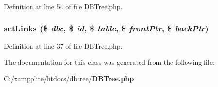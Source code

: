 Definition at line 54 of file DBTree.php.
\subsubsection[{setLinks}]{\setlength{\rightskip}{0pt plus 5cm}setLinks (\$ {\em dbc}, \/  \$ {\em id}, \/  \$ {\em table}, \/  \$ {\em frontPtr}, \/  \$ {\em backPtr})}\label{class_d_b_tree_a76d25a72b7ae67a7b4633269f0263ed4}


Definition at line 37 of file DBTree.php.

The documentation for this class was generated from the following file:\begin{DoxyCompactItemize}
\item 
C:/xampplite/htdocs/dbtree/{\bf DBTree.php}\end{DoxyCompactItemize}
